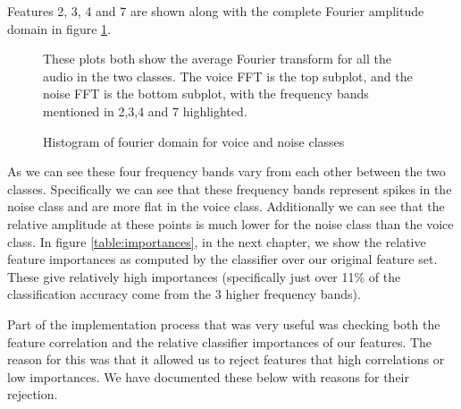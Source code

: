 \documentclass[ %
                    author={Sam Phippen},
                supervisor={Dr. Rafal Bogacz},
                     title={Real time voice activity detectors in noisy personal computing environments},
                  subtitle={},
                    degree={MEng},
                      year={2012} ]{thesis}
\begin{document}
Features 2, 3, 4 and 7 are shown along with the complete Fourier amplitude
domain in figure \ref{fig:frequencies}.

\begin{figure}

    These plots both show the average Fourier transform for all the audio in
    the two classes.  The voice FFT is the top subplot, and the noise FFT is
    the bottom subplot, with the frequency bands mentioned in 2,3,4 and 7
    highlighted.

    \caption{Histogram of fourier domain for voice and noise classes}
    \label{fig:frequencies}
\end{figure}

As we can see these four frequency bands vary from each other between the two
classes. Specifically we can see that these frequency bands represent spikes in
the noise class and are more flat in the voice class. Additionally we can see
that the relative amplitude at these points is much lower for the noise class
than the voice class. In figure \ref{table:importances}, in the next chapter,
we show the relative feature importances as computed by the classifier over our
original feature set. These give relatively high importances (specifically just
over 11\% of the classification accuracy come from the 3 higher frequency
bands).

Part of the implementation process that was very useful was checking both the
feature correlation and the relative classifier importances of our features.
The reason for this was that it allowed us to reject features that high
correlations or low importances. We have documented these below with reasons
for their rejection.
\end{document}
